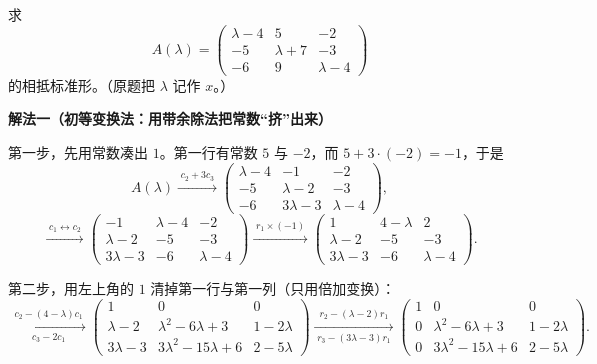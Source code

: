 \begin{example}[求相抵标准形]
求
\[
A(\lambda)=
\begin{pmatrix}
\lambda-4 & 5 & -2\\
-5 & \lambda+7 & -3\\
-6 & 9 & \lambda-4
\end{pmatrix}
\]
的相抵标准形。（原题把 \(\lambda\) 记作 \(x\)。）

\textbf{解法一（初等变换法：用带余除法把常数“挤”出来）}

第一步，先用常数凑出 \(1\)。第一行有常数 \(5\) 与 \(-2\)，而 \(5+3\cdot(-2)=-1\)，于是
\[
A(\lambda)\xrightarrow{\;c_2+3c_3\;}
\begin{pmatrix}
\lambda-4 & -1 & -2\\
-5 & \lambda-2 & -3\\
-6 & 3\lambda-3 & \lambda-4
\end{pmatrix},
\]
\[
\xrightarrow{\;c_1\leftrightarrow c_2\;}
\begin{pmatrix}
-1 & \lambda-4 & -2\\
\lambda-2 & -5 & -3\\
3\lambda-3 & -6 & \lambda-4
\end{pmatrix}
\xrightarrow{\;r_1\times(-1)\;}
\begin{pmatrix}
1 & 4-\lambda & 2\\
\lambda-2 & -5 & -3\\
3\lambda-3 & -6 & \lambda-4
\end{pmatrix}.
\]

第二步，用左上角的 \(1\) 清掉第一行与第一列（只用倍加变换）：
\[
\xrightarrow[\;c_3-2c_1\;]{\;c_2-(4-\lambda)c_1\;}
\begin{pmatrix}
1 & 0 & 0\\
\lambda-2 & \lambda^2-6\lambda+3 & 1-2\lambda\\
3\lambda-3 & 3\lambda^2-15\lambda+6 & 2-5\lambda
\end{pmatrix}
\xrightarrow[\;r_3-(3\lambda-3)r_1\;]{\;r_2-(\lambda-2)r_1\;}
\begin{pmatrix}
1 & 0 & 0\\
0 & \lambda^2-6\lambda+3 & 1-2\lambda\\
0 & 3\lambda^2-15\lambda+6 & 2-5\lambda
\end{pmatrix}.
\]


\end{example}
